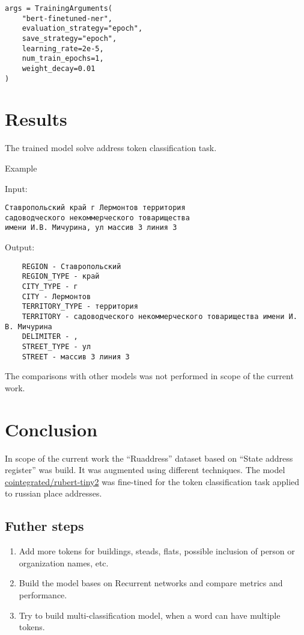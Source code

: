 \documentclass{article}
\begin{document}
\begin{verbatim}
args = TrainingArguments(
    "bert-finetuned-ner",
    evaluation_strategy="epoch",
    save_strategy="epoch",
    learning_rate=2e-5,
    num_train_epochs=1,
    weight_decay=0.01
)
\end{verbatim}


\section{Results}

The trained model solve address token classification task.

Example

Input:
\begin{verbatim}
Ставропольский край г Лермонтов территория
садоводческого некоммерческого товарищества
имени И.В. Мичурина, ул массив 3 линия 3
\end{verbatim}
Output:
\begin{verbatim}
    REGION - Ставропольский
    REGION_TYPE - край
    CITY_TYPE - г
    CITY - Лермонтов
    TERRITORY_TYPE - территория
    TERRITORY - садоводческого некоммерческого товарищества имени И. В. Мичурина
    DELIMITER - ,
    STREET_TYPE - ул
    STREET - массив 3 линия 3
\end{verbatim}

The comparisons with other models was not performed in scope of the current work.


\section{Conclusion}

In scope of the current work the ``Ruaddress'' dataset based on ``State address register'' was build.
It was augmented using different techniques.
The model \href{https://huggingface.co/cointegrated/rubert-tiny2}{cointegrated/rubert-tiny2}
was fine-tined for the token classification task applied to russian place addresses.

\subsection{Futher steps}
\begin{enumerate}
    \item Add more tokens for buildings, steads, flats, possible inclusion of person or organization names, etc.
    \item Build the model bases on Recurrent networks and compare metrics and performance.
    \item Try to build multi-classification model, when a word can have multiple tokens.
\end{enumerate}





\end{document}
